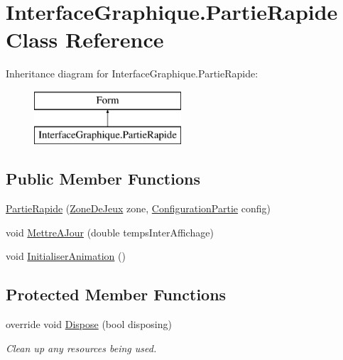 \hypertarget{class_interface_graphique_1_1_partie_rapide}{\section{Interface\-Graphique.\-Partie\-Rapide Class Reference}
\label{class_interface_graphique_1_1_partie_rapide}
}
Inheritance diagram for Interface\-Graphique.\-Partie\-Rapide\-:\begin{figure}[H]
\begin{center}
\leavevmode
\includegraphics[height=2.000000cm]{class_interface_graphique_1_1_partie_rapide}
\end{center}
\end{figure}
\subsection*{Public Member Functions}
\begin{DoxyCompactItemize}
\item 
\hyperlink{class_interface_graphique_1_1_partie_rapide_ad3daf9eb8862499ed54ebe2e5cb14b2a}{Partie\-Rapide} (\hyperlink{class_interface_graphique_1_1_zone_de_jeux}{Zone\-De\-Jeux} zone, \hyperlink{class_interface_graphique_1_1_configuration_partie}{Configuration\-Partie} config)
\item 
void \hyperlink{class_interface_graphique_1_1_partie_rapide_a91f0bc169fe8a836dd75d2447b4db424}{Mettre\-A\-Jour} (double temps\-Inter\-Affichage)
\item 
void \hyperlink{class_interface_graphique_1_1_partie_rapide_af5ff96f0fca70376fe5e1a69565eb592}{Initialiser\-Animation} ()
\end{DoxyCompactItemize}
\subsection*{Protected Member Functions}
\begin{DoxyCompactItemize}
\item 
override void \hyperlink{class_interface_graphique_1_1_partie_rapide_a248957e40a9fe9d9ca2e3c90e117b192}{Dispose} (bool disposing)
\begin{DoxyCompactList}\small\item\em Clean up any resources being used. \end{DoxyCompactList}\end{DoxyCompactItemize}



